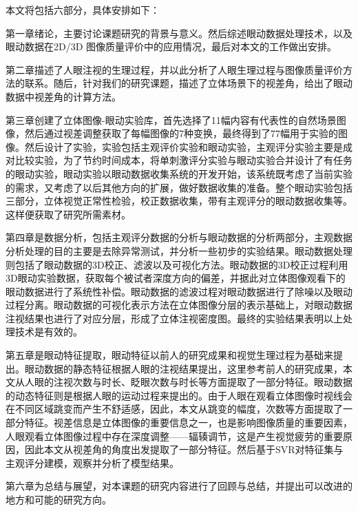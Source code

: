 本文将包括六部分，具体安排如下：

第一章绪论，主要讨论课题研究的背景与意义。然后综述眼动数据处理技术，以及眼动数据在2D/3D 图像质量评价中的应用情况，最后对本文的工作做出安排。

第二章描述了人眼注视的生理过程，并以此分析了人眼生理过程与图像质量评价方法的联系。随后，针对我们的研究课题，描述了立体场景下的视差角，给出了眼动数据中视差角的计算方法。

第三章创建了立体图像-眼动实验库，首先选择了11幅内容有代表性的自然场景图像，然后通过视差调整获取了每幅图像的7种变换，最终得到了77幅用于实验的图像。然后设计了实验，实验包括主观评价实验和眼动实验，主观评分实验主要是成对比较实验，为了节约时间成本，将单刺激评分实验与眼动实验合并设计了有任务的眼动实验，眼动实验以眼动数据收集系统的开发开始，该系统既考虑了当前实验的需求，又考虑了以后其他方向的扩展，做好数据收集的准备。整个眼动实验包括三部分，立体视觉正常性检验，校正数据收集，带有主观评分的眼动数据收集等。这样便获取了研究所需素材。

第四章是数据分析，包括主观评分数据的分析与眼动数据的分析两部分，主观数据分析处理的目的主要是去除异常测试，并分析一些初步的实验结果。眼动数据处理则包括了眼动数据的3D校正、滤波以及可视化方法。眼动数据的3D校正过程利用3D眼动实验数据，获取每个被试者深度方向的偏差，并据此对立体图像观看下的眼动数据进行了系统性补偿。眼动数据的滤波过程对眼动数据进行了除噪以及眼动过程分离。眼动数据的可视化表示方法在立体图像分层的表示基础上，对眼动数据注视结果也进行了对应分层，形成了立体注视密度图。最终的实验结果表明以上处理技术是有效的。

第五章是眼动特征提取，眼动特征以前人的研究成果和视觉生理过程为基础来提出。眼动数据的静态特征根据人眼的注视结果提出，这里参考前人的研究成果\parencite{zhang2014application}，本文从人眼的注视次数与时长、眨眼次数与时长等方面提取了一部分特征。眼动数据的动态特征则是根据人眼的运动过程来提出的。由于人眼在观看立体图像时视线会在不同区域跳变而产生不舒适感，因此，本文从跳变的幅度，次数等方面提取了一部分特征。视差信息是立体图像的重要信息之一，也是影响图像质量的重要因素，人眼观看立体图像过程中存在深度调整——辐辏调节，这是产生视觉疲劳的重要原因，因此本文从视差角的角度出发提取了一部分特征。然后基于SVR对特征集与主观评分建模，观察并分析了模型结果。

第六章为总结与展望，对本课题的研究内容进行了回顾与总结，并提出可以改进的地方和可能的研究方向。

